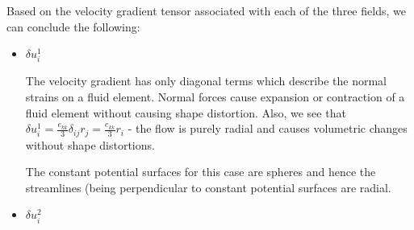 \documentclass[11pt,a4paper]{article}
\newcommand{\dl}{\delta}
\newcommand{\dij}{\delta_{ij}}
\newcommand{\1}{\vect{1}}
\begin{document}
Based on the velocity gradient tensor associated with each of the three fields, we can conclude the following:
\begin{itemize}
\item $\dl u^1_i$

The velocity gradient has only diagonal terms which describe the normal strains on a fluid element. Normal forces cause expansion or contraction of a fluid element without causing shape distortion. Also, we see that $\dl u^1_i = \frac{e_{kk}}{3}\dij r_j = \frac{e_{kk}}{3}r_i$ - the flow is purely radial and causes volumetric changes without shape distortions.

The constant potential surfaces for this case are spheres and hence the streamlines (being perpendicular to constant potential surfaces are radial.

\item $\dl u^2_i$


\end{itemize}
\end{document}
